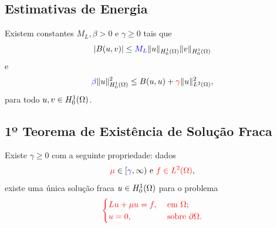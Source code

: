 \subsection*{Estimativas de Energia}
\begin{frame}
\begin{teo}
Existem constantes {\color{blue}\(M_L,\beta>0\)} e {\color{red}\(\gamma \geq 0\)} tais que 
\[|B(u,v)|\leq {\color{blue}M_L} \lVert u\rVert_{H_0^1(\Omega)}\lVert v\rVert_{H_0^1(\Omega)}\]
e
\[
{\color{blue}\beta}\lVert u\rVert_{H_0^1(\Omega)}^2\leq B(u,u)+{\color{red}\gamma} \lVert u\rVert_{L^2(\Omega)}^2,
\]
para todo \(u,v\in H_0^1(\Omega)\).
\end{teo}
\end{frame}
\subsection*{1º Teorema de Existência de Solução Fraca}
\begin{frame}
\begin{teo}
Existe {\color{blue}\(\gamma \geq 0\)} com a seguinte propriedade: dados 
\[ {\color{red}\mu}\in [{\color{blue}\gamma},\infty) \text{ e } {\color{red}f\in L^2(\Omega)},\]
existe uma única solução fraca {\color{red}\(u\in H_0^1(\Omega)\)} para o problema 
\[
{\color{red}\begin{cases}
Lu+\mu u=f, & \text{ em } \Omega;\\
u=0, & \text{ sobre } \partial\Omega.
\end{cases}}
\]
\end{teo}

\end{frame}

